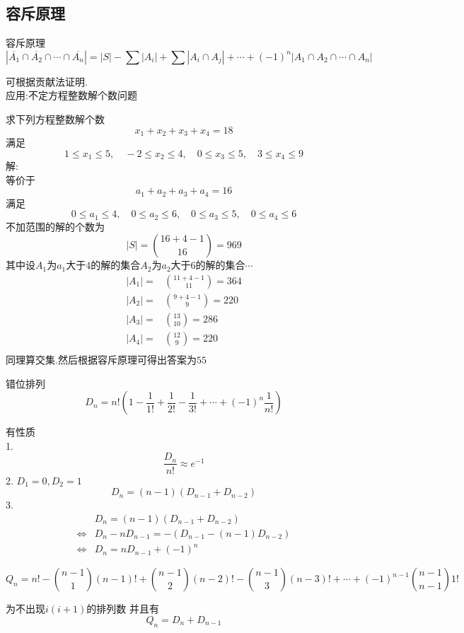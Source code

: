 \subsection{容斥原理}
\begin{theorem}
容斥原理
$$
|\overline{A_1}\cap \overline{A_2} \cap \cdots \cap \overline{A_n}|=|S|-\sum|A_i|+\sum|A_i\cap A_j|+\cdots+(-1)^n|A_1\cap A_2\cap \cdots \cap A_n|
$$
\end{theorem}
可根据贡献法证明.\\
应用:不定方程整数解个数问题
\begin{example}
  求下列方程整数解个数
  $$
  x_1+x_2+x_3+x_4=18
  $$
  满足
  $$
  1\leq x_1 \leq 5 ,\quad -2\leq x_2\leq4,\quad0\leq x_3\leq 5,\quad 3\leq x_4\leq 9
  $$
  解:\\
  等价于
  $$
  a_1+a_2+a_3+a_4=16
  $$
  满足
  $$
  0\leq a_1 \leq 4 ,\quad 0\leq a_2\leq6,\quad0\leq a_3\leq 5,\quad 0\leq a_4\leq 6
  $$
  不加范围的解的个数为
  $$
  |S|=\binom{16+4-1}{16}=969
  $$
  其中设$A_1$为$a_1$大于$4$的解的集合$A_2$为$a_2$大于6的解的集合$\cdots$
  $$
  \begin{aligned}
  |A_1|=&\binom{11+4-1}{11}=364\\
  |A_2|=&\binom{9+4-1}{9}=220\\
  |A_3|=&\binom{13}{10}=286\\
  |A_4|=&\binom{12}{9}=220\\
  \end{aligned}
  $$
  同理算交集.然后根据容斥原理可得出答案为$55$
\end{example}

\begin{proposition}
  错位排列
  $$
  D_n=n!\left(1-\frac{1}{1!}+\frac{1}{2!}-\frac{1}{3!}+\cdots+(-1)^n\frac{1}{n!}\right)
  $$
\end{proposition}
有性质\\
1.$$\frac{D_n}{n!}\approx e^{-1}$$
2.
$D_1=0,D_2=1$
$$
D_n=(n-1)(D_{n-1}+D_{n-2})
$$
3.
$$
\begin{aligned}
&D_n=(n-1)(D_{n-1}+D_{n-2})\\
\iff&D_n-nD_{n-1}=-(D_{n-1}-(n-1)D_{n-2})\\
\iff&D_n=nD_{n-1}+(-1)^n
\end{aligned}
$$

\begin{proposition}
$$ 
 Q_n=n!-\binom{n-1}{1}(n-1)!+\binom{n-1}{2}(n-2)!-\binom{n-1}{3}(n-3)!+\cdots+(-1)^{n-1}\binom{n-1}{n-1}1!
$$
\end{proposition}
为不出现$i(i+1)$的排列数
并且有
$$
Q_n=D_n+D_{n-1}
$$
